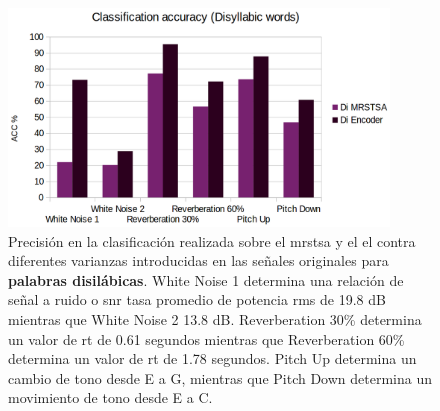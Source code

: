 \begin{figure}[h!]
    \centering
    \includegraphics[width=0.9\textwidth]{DI_ACC.png}
    \caption{Precisión en la clasificación realizada sobre el \gls{mrstsa} y el \gls{el} contra diferentes varianzas introducidas en las señales originales
    para \textbf{palabras disilábicas}.
    White Noise 1 determina una relación de señal a ruido o \gls{snr} tasa promedio de potencia \gls{rms} de 19.8 dB mientras que White Noise 2 13.8 dB.
    Reverberation 30\% determina un valor de \gls{rt} de 0.61 segundos mientras que Reverberation 60\% determina un valor de \gls{rt} de 1.78 segundos.
    Pitch Up determina un cambio de tono desde E a G, mientras que Pitch Down determina un movimiento de tono desde E a C.}
    \label{fig:DI_ACC}
\end{figure}

